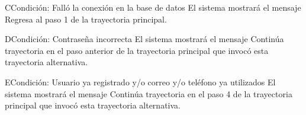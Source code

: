 	\begin{UCtrayectoriaA}{C}{Condición: Falló la conexión en la base de datos}
		\UCpaso[\UCsist] El sistema mostrará el mensaje 
		\UCpaso[\UCsist] Regresa al paso 1 de la trayectoria principal. 
	\end{UCtrayectoriaA}
	\begin{UCtrayectoriaA}{D}{Condición: Contraseña incorrecta}
		\UCpaso[\UCsist] El sistema mostrará el mensaje 
		\UCpaso[\UCsist] Continúa trayectoria en el paso anterior de la trayectoria  principal que invocó esta trayectoria alternativa. 
	\end{UCtrayectoriaA}
	\begin{UCtrayectoriaA}{E}{Condición: Usuario ya registrado y/o correo y/o teléfono ya utilizados}
		\UCpaso[\UCsist] El sistema mostrará el mensaje 
		\UCpaso[\UCsist] Continúa trayectoria en el paso 4 de la trayectoria  principal que invocó esta trayectoria alternativa. 
	\end{UCtrayectoriaA}
